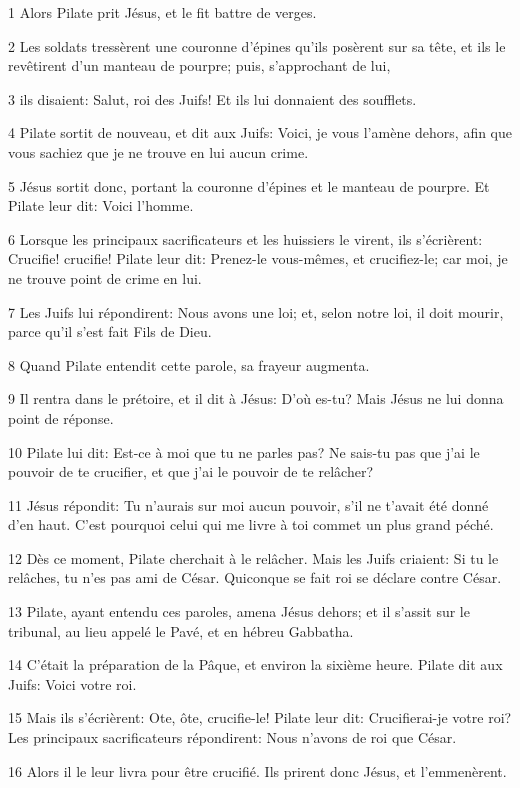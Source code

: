 \par 1 Alors Pilate prit Jésus, et le fit battre de verges.
\par 2 Les soldats tressèrent une couronne d'épines qu'ils posèrent sur sa tête, et ils le revêtirent d'un manteau de pourpre; puis, s'approchant de lui,
\par 3 ils disaient: Salut, roi des Juifs! Et ils lui donnaient des soufflets.
\par 4 Pilate sortit de nouveau, et dit aux Juifs: Voici, je vous l'amène dehors, afin que vous sachiez que je ne trouve en lui aucun crime.
\par 5 Jésus sortit donc, portant la couronne d'épines et le manteau de pourpre. Et Pilate leur dit: Voici l'homme.
\par 6 Lorsque les principaux sacrificateurs et les huissiers le virent, ils s'écrièrent: Crucifie! crucifie! Pilate leur dit: Prenez-le vous-mêmes, et crucifiez-le; car moi, je ne trouve point de crime en lui.
\par 7 Les Juifs lui répondirent: Nous avons une loi; et, selon notre loi, il doit mourir, parce qu'il s'est fait Fils de Dieu.
\par 8 Quand Pilate entendit cette parole, sa frayeur augmenta.
\par 9 Il rentra dans le prétoire, et il dit à Jésus: D'où es-tu? Mais Jésus ne lui donna point de réponse.
\par 10 Pilate lui dit: Est-ce à moi que tu ne parles pas? Ne sais-tu pas que j'ai le pouvoir de te crucifier, et que j'ai le pouvoir de te relâcher?
\par 11 Jésus répondit: Tu n'aurais sur moi aucun pouvoir, s'il ne t'avait été donné d'en haut. C'est pourquoi celui qui me livre à toi commet un plus grand péché.
\par 12 Dès ce moment, Pilate cherchait à le relâcher. Mais les Juifs criaient: Si tu le relâches, tu n'es pas ami de César. Quiconque se fait roi se déclare contre César.
\par 13 Pilate, ayant entendu ces paroles, amena Jésus dehors; et il s'assit sur le tribunal, au lieu appelé le Pavé, et en hébreu Gabbatha.
\par 14 C'était la préparation de la Pâque, et environ la sixième heure. Pilate dit aux Juifs: Voici votre roi.
\par 15 Mais ils s'écrièrent: Ote, ôte, crucifie-le! Pilate leur dit: Crucifierai-je votre roi? Les principaux sacrificateurs répondirent: Nous n'avons de roi que César.
\par 16 Alors il le leur livra pour être crucifié. Ils prirent donc Jésus, et l'emmenèrent.
